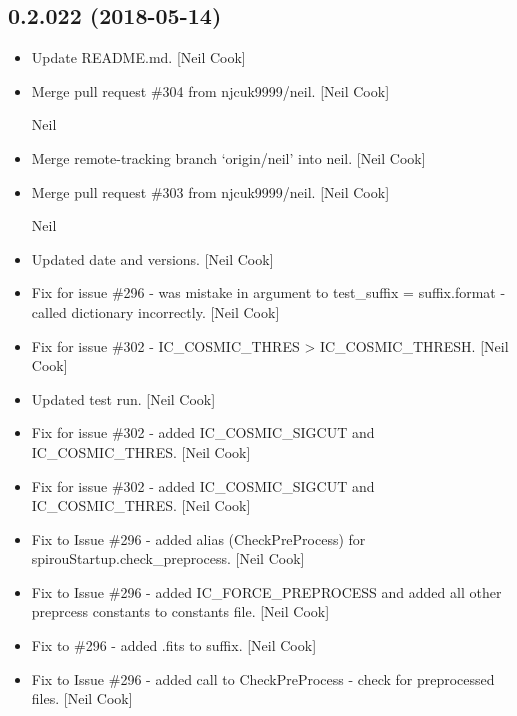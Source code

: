 \documentclass[a4paper,10pt,english]{report}
\begin{document}
\subsection{0.2.022 (2018-05-14)}
\label{\detokenize{misc/changelog:id437}}\begin{itemize}
\item {} 
Update README.md. {[}Neil Cook{]}

\item {} 
Merge pull request \#304 from njcuk9999/neil. {[}Neil Cook{]}

Neil

\item {} 
Merge remote-tracking branch ‘origin/neil’ into neil. {[}Neil Cook{]}

\item {} 
Merge pull request \#303 from njcuk9999/neil. {[}Neil Cook{]}

Neil

\item {} 
Updated date and versions. {[}Neil Cook{]}

\item {} 
Fix for issue \#296 - was mistake in argument to test\_suffix =
suffix.format  - called dictionary incorrectly. {[}Neil Cook{]}

\item {} 
Fix for issue \#302 - IC\_COSMIC\_THRES \textendash{}\textgreater{} IC\_COSMIC\_THRESH. {[}Neil Cook{]}

\item {} 
Updated test run. {[}Neil Cook{]}

\item {} 
Fix for issue \#302 - added IC\_COSMIC\_SIGCUT and IC\_COSMIC\_THRES. {[}Neil
Cook{]}

\item {} 
Fix for issue \#302 - added IC\_COSMIC\_SIGCUT and IC\_COSMIC\_THRES. {[}Neil
Cook{]}

\item {} 
Fix to Issue \#296 - added alias (CheckPreProcess) for
spirouStartup.check\_preprocess. {[}Neil Cook{]}

\item {} 
Fix to Issue \#296 - added IC\_FORCE\_PREPROCESS and added all other
preprcess constants to constants file. {[}Neil Cook{]}

\item {} 
Fix to \#296 - added .fits to suffix. {[}Neil Cook{]}

\item {} 
Fix to Issue \#296 - added call to CheckPreProcess - check for
preprocessed files. {[}Neil Cook{]}


\end{itemize}
\end{document}
